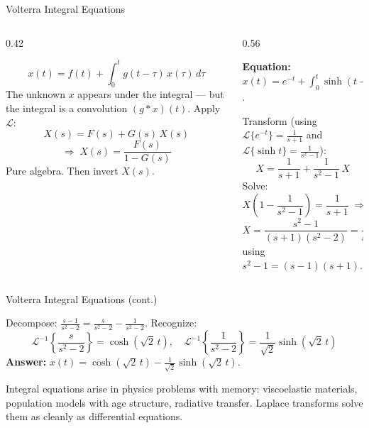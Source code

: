 \documentclass[aspectratio=169,11pt]{beamer}
\begin{document}
\begin{frame}{Volterra Integral Equations}
\footnotesize
\begin{columns}[T]
\begin{column}{0.42\textwidth}
\begin{formulabox}
\[x(t) = f(t) + \int_0^t g(t-\tau)\, x(\tau)\, d\tau\]
The unknown $x$ appears under the integral --- but the integral is a convolution $(g * x)(t)$. Apply $\mathcal{L}$:
\[X(s) = F(s) + G(s)\,X(s)\]
\[\Rightarrow\; X(s) = \frac{F(s)}{1 - G(s)}\]
Pure algebra. Then invert $X(s)$.
\end{formulabox}
\end{column}
\begin{column}{0.56\textwidth}
\begin{examplebox}
\textbf{Equation:} $x(t) = e^{-t} + \int_0^t \sinh(t-\tau)\, x(\tau)\, d\tau$.

Transform (using $\mathcal{L}\{e^{-t}\} = \frac{1}{s+1}$ and $\mathcal{L}\{\sinh t\} = \frac{1}{s^2-1}$):
\[X = \frac{1}{s+1} + \frac{1}{s^2-1}\,X\]
Solve:
\[X\!\left(1 - \frac{1}{s^2-1}\right) = \frac{1}{s+1} \;\Rightarrow\; X\cdot\frac{s^2-2}{s^2-1} = \frac{1}{s+1}\]
\[X = \frac{s^2-1}{(s+1)(s^2-2)} = \frac{s-1}{s^2-2}\]
using $s^2-1 = (s-1)(s+1)$.
\end{examplebox}
\end{column}
\end{columns}
\end{frame}

\begin{frame}{Volterra Integral Equations (cont.)}
\footnotesize
\begin{examplebox}
Decompose: $\frac{s-1}{s^2-2} = \frac{s}{s^2-2} - \frac{1}{s^2-2}$. Recognize:
\[\mathcal{L}^{-1}\!\left\{\frac{s}{s^2-2}\right\} = \cosh(\sqrt{2}\,t), \quad \mathcal{L}^{-1}\!\left\{\frac{1}{s^2-2}\right\} = \frac{1}{\sqrt{2}}\sinh(\sqrt{2}\,t)\]
\textbf{Answer:} $x(t) = \cosh(\sqrt{2}\,t) - \frac{1}{\sqrt{2}}\sinh(\sqrt{2}\,t)$.
\end{examplebox}
\vspace{0.5mm}
\begin{conceptbox}
Integral equations arise in physics problems with memory: viscoelastic materials, population models with age structure, radiative transfer. Laplace transforms solve them as cleanly as differential equations.
\end{conceptbox}
\end{frame}
\end{document}
